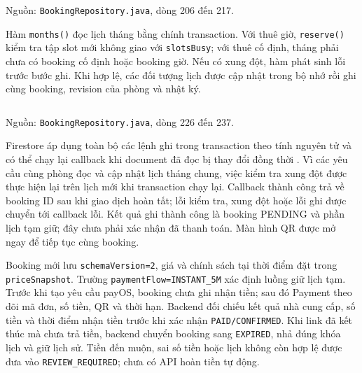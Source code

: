 \par\medskip\noindent\begin{minipage}{\linewidth}
\inputminted[firstnumber=1]{java}{Resources/chapter4/code/booking-prepare.java}
{\footnotesize\noindent Nguồn: \texttt{Booking\allowbreak{}Repository.\allowbreak{}java}, dòng 206 đến 217.\par}
\end{minipage}\par\medskip

Hàm \texttt{months()} đọc lịch tháng bằng chính transaction. Với thuê giờ, \texttt{reserve()} kiểm tra tập slot mới không giao với \texttt{slotsBusy}; với thuê cố định, tháng phải chưa có booking cố định hoặc booking giờ. Nếu có xung đột, hàm phát sinh lỗi trước bước ghi. Khi hợp lệ, các đối tượng lịch được cập nhật trong bộ nhớ rồi ghi cùng booking, revision của phòng và nhật ký.

\par\medskip\noindent\begin{minipage}{\linewidth}
\inputminted[firstnumber=1]{java}{Resources/chapter4/code/booking-commit.java}
{\footnotesize\noindent Nguồn: \texttt{Booking\allowbreak{}Repository.\allowbreak{}java}, dòng 226 đến 237.\par}
\end{minipage}\par\medskip

Firestore áp dụng toàn bộ các lệnh ghi trong transaction theo tính nguyên tử và có thể chạy lại callback khi document đã đọc bị thay đổi đồng thời \parencite{firebase_transaction}. Vì các yêu cầu cùng phòng đọc và cập nhật lịch tháng chung, việc kiểm tra xung đột được thực hiện lại trên lịch mới khi transaction chạy lại. Callback thành công trả về booking ID sau khi giao dịch hoàn tất; lỗi kiểm tra, xung đột hoặc lỗi ghi được chuyển tới callback lỗi. Kết quả ghi thành công là booking PENDING và phần lịch tạm giữ; đây chưa phải xác nhận đã thanh toán. Màn hình QR được mở ngay để tiếp tục cùng booking.

Booking mới lưu \texttt{schema\allowbreak{}Version=\allowbreak{}2}, giá và chính sách tại thời điểm đặt trong \texttt{price\allowbreak{}Snapshot}. Trường \texttt{paymentFlow=INSTANT\_5M} xác định luồng giữ lịch tạm. Trước khi tạo yêu cầu payOS, booking chưa ghi nhận tiền; sau đó Payment theo dõi mã đơn, số tiền, QR và thời hạn. Backend đối chiếu kết quả nhà cung cấp, số tiền và thời điểm nhận tiền trước khi xác nhận \texttt{PAID/CONFIRMED}. Khi link đã kết thúc mà chưa trả tiền, backend chuyển booking sang \texttt{EXPIRED}, nhả đúng khóa lịch và giữ lịch sử. Tiền đến muộn, sai số tiền hoặc lịch không còn hợp lệ được đưa vào \texttt{REVIEW\_REQUIRED}; chưa có API hoàn tiền tự động.

